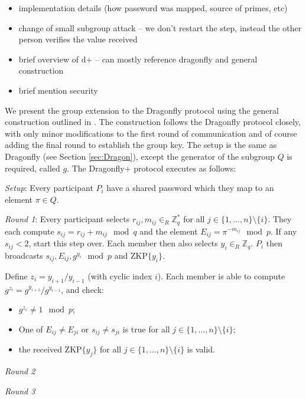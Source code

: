 

\begin{itemize}
    \item implementation details (how password was mapped, source of primes, etc)
    \item change of small subgroup attack -- we don't restart the step, instead the other person verifies the value received
    \item brief overview of d+ -- can mostly reference dragonfly and general construction
    \item brief mention security
\end{itemize}

We present the group extension to the Dragonfly protocol using the general construction outlined in \cite{HaYiChSh15}.
The construction follows the Dragonfly protocol closely, with only minor modifications to the first round of communication
and of course adding the final round to establish the group key. The setup is the same as Dragonfly (see Section \ref{sec:Dragon}),
except the generator of the subgroup $Q$ is required, called $g$. The Dragonfly+ protocol executes as follows:

\emph{Setup}: Every participant $P_i$ have a shared password which they map to an element $\pi \in Q$.

\emph{Round 1}: Every participant selects $r_{ij}, m_{ij} \in_R \mathbb{Z}_q^*$ for all $j \in \{1,\ldots,n\} \setminus \{i\}$.
They each compute $s_{ij} = r_{ij} + m_{ij} \mod q$ and the element $E_{ij} = \pi^{-m_{ij}} \mod p$. If any $s_{ij} < 2$, start this step over.
Each member then also selects $y_i \in_R \mathbb{Z}_q$. $P_i$ then broadcasts $s_{ij}, E_{ij}, g^{y_i} \mod p$ and $\text{ZKP}\{y_i\}$.

Define $z_i = y_{i+1} / y_{i-1}$ (with cyclic index $i$). Each member is able to compute $g^{z_i} = g^{y_{i+1}} / g^{y_{i-1}}$, and check:
\begin{itemize}
    \item $g^{z_i} \neq 1 \mod p$;
    \item One of $E_{ij} \neq E_{ji}$ or $s_{ij} \neq s_{ji}$ is true for all $j \in \{1,\ldots,n\} \setminus \{i\}$;
    \item the received $\text{ZKP}\{y_j\}$ for all $j \in \{1,\ldots,n\} \setminus \{i\}$ is valid.
\end{itemize}

\emph{Round 2}

\emph{Round 3}
